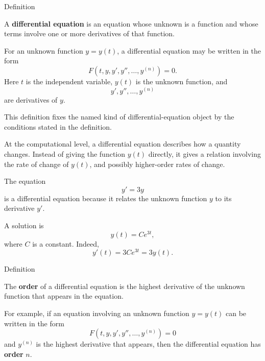 
\begin{definitionbox}{Definition}
\begin{definition}
\label{def:ordinary-differential-equations-terminology-differential-equation}
A \textbf{differential equation} is an equation whose unknown is a function and whose terms involve one or more derivatives of that function.

For an unknown function $y=y(t)$, a differential equation may be written in the form
\[
F(t,y,y',y'',\dots,y^{(n)})=0.
\]
Here $t$ is the independent variable, $y(t)$ is the unknown function, and
\[
y',y'',\dots,y^{(n)}
\]
are derivatives of $y$.
\end{definition}
\end{definitionbox}

\begin{remark*}
This definition fixes the named kind of differential-equation object by the
conditions stated in the definition.
\end{remark*}

\NoLocalDependencies

\begin{remark*}[Interpretation]
At the computational level, a differential equation describes how a quantity changes. Instead of giving the function $y(t)$ directly, it gives a relation involving the rate of change of $y(t)$, and possibly higher-order rates of change.
\end{remark*}

\begin{example*}
The equation
\[
y'=3y
\]
is a differential equation because it relates the unknown function $y$ to its derivative $y'$.

A solution is
\[
y(t)=Ce^{3t},
\]
where $C$ is a constant. Indeed,
\[
y'(t)=3Ce^{3t}=3y(t).
\]
\end{example*}


\begin{definitionbox}{Definition}
\begin{definition}
\label{def:ordinary-differential-equations-terminology-order-of-a-differential-equation}
The \textbf{order} of a differential equation is the highest derivative of the unknown function that appears in the equation.

For example, if an equation involving an unknown function $y=y(t)$ can be written in the form
\[
F(t,y,y',y'',\dots,y^{(n)})=0
\]
and $y^{(n)}$ is the highest derivative that appears, then the differential equation has \textbf{order} $n$.
\end{definition}
\end{definitionbox}

